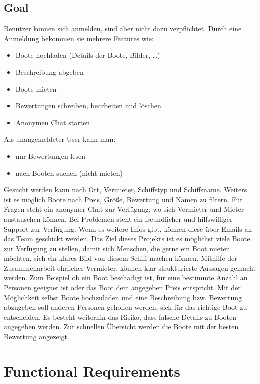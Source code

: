 \documentclass[12pt]{article}
\theoremstyle{definition}
\begin{document}
\subsection{Goal}
	Benutzer können sich anmelden, sind aber nicht dazu verpflichtet. Durch eine Anmeldung
	bekommen sie mehrere Features wie:
	\begin{itemize}
		\item Boote hochladen (Details der Boote, Bilder, …)
		\item Beschreibung abgeben
		\item Boote mieten
		\item Bewertungen schreiben, bearbeiten und löschen
		\item Anonymen Chat starten
	\end{itemize}
	Als unangemeldeter User kann man:
	\begin{itemize}
		\item nur Bewertungen lesen
		\item nach Booten suchen (nicht mieten)
	\end{itemize}
	Gesucht werden kann nach Ort, Vermieter, Schiffstyp und Schiffsname. Weiters ist es möglich Boote nach Preis, Größe, Bewertung und Namen zu filtern.
	Für Fragen steht ein anonymer Chat zur Verfügung, wo sich Vermieter und Mieter austauschen können. Bei Problemen steht ein freundlicher und hilfswilliger Support zur Verfügung. Wenn es weitere Infos gibt, können diese über Emails an das Team geschickt werden.
	Das Ziel dieses Projekts ist es möglichst viele Boote zur Verfügung zu stellen, damit sich Menschen, die gerne ein Boot mieten möchten, sich ein klares Bild von diesem Schiff machen können. Mithilfe der Zusammenarbeit ehrlicher Vermieter, können klar strukturierte Aussagen gemacht werden. Zum Beispiel ob ein Boot beschädigt ist, für eine bestimmte Anzahl an Personen geeignet ist oder das Boot dem angegeben Preis entspricht. Mit der Möglichkeit selbst Boote hochzuladen und eine Beschreibung bzw. Bewertung abzugeben soll anderen Personen geholfen werden, sich für das richtige Boot zu entscheiden. Es besteht weiterhin das Risiko, dass falsche Details zu Booten angegeben werden. Zur schnellen Übersicht werden die Boote mit der besten Bewertung angezeigt.
\pagebreak

\section{Functional Requirements}
\end{document}
